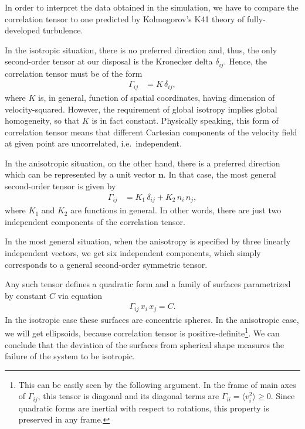 In order to interpret the data obtained in the simulation, we have to compare the correlation tensor to one predicted by Kolmogorov's K41 theory of fully-developed turbulence. 

In the isotropic situation, there is no preferred direction and, thus, the only second-order tensor at our disposal is the Kronecker delta $\delta_{ij}$. Hence, the correlation tensor must be of the form
\begin{align}
\Gamma_{ij} &= K \, \delta_{ij},
\end{align}
where $K$ is, in general, function of spatial coordinates, having dimension of velocity-squared.
However, the requirement of global isotropy implies global homogeneity, so that $K$ is in fact constant.
Physically speaking, this form of correlation tensor means that different Cartesian components of the velocity field at given point are uncorrelated, i.e.\ independent.

In the anisotropic situation, on the other hand, there is a preferred direction which can be represented by a unit vector $\bm{n}$. In that case, the most general second-order tensor is given by 
\begin{align}
\Gamma_{ij} &= K_1 \, \delta_{ij} + K_2 \, n_i \, n_j ,
\end{align}
where $K_1$ and $K_2$ are functions in general. In other words, there are just two independent components of the correlation tensor. 

In the most general situation, when the anisotropy is specified by three linearly independent vectors, we get six independent components, which simply corresponds to a general second-order symmetric tensor. 

Any such tensor defines a quadratic form and a family of surfaces parametrized by constant  $C$ via equation
\begin{align}
\Gamma_{ij} \, x_i \, x_j = C.
\end{align} 
In the isotropic case these surfaces are concentric spheres.
In the anisotropic case, we will get ellipsoids, because correlation tensor is positive-definite\footnote{This can be easily seen by the following argument. In the frame of main axes of $\Gamma_{ij}$, this tensor is diagonal and its diagonal terms are $\Gamma_{ii} = \langle v_{i}^2 \rangle \geq 0$. Since quadratic forms are inertial with respect to rotations, this property is preserved in any frame.}. We can conclude that the deviation of the surfaces from spherical shape measures the failure of the system to be isotropic.

